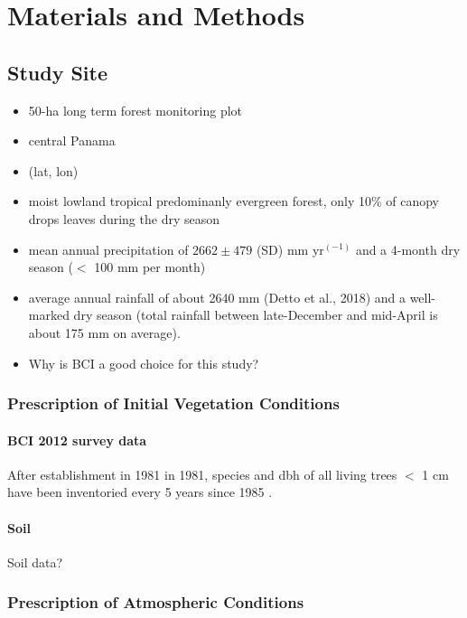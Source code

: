 \documentclass[10pt]{article}
\begin{document}
\section*{Materials and Methods}

\subsection*{Study Site}

\begin{itemize}
    \item 50-ha long term forest monitoring plot
    \item  central Panama
    \item (lat, lon)
    \item moist lowland tropical predominanly evergreen forest, only 10\% of canopy drops leaves during the dry season %
    \item mean annual precipitation of $2662 \pm 479$ (SD) mm yr$^{(-1)}$ and a 4-month dry season ($<$ 100 mm per month)  
    \item average annual rainfall of about 2640 mm (Detto et al.,
2018) and a well-marked dry season (total rainfall between late-December and mid-April is about 175 mm on average). 
    \item Why is BCI a good choice for this study?
\end{itemize}

\subsubsection*{Prescription of Initial Vegetation Conditions}

\paragraph{BCI 2012 survey data}
After establishment in 1981 in 1981, species and dbh of all living trees $<$ 1 cm have been inventoried every 5 years since 1985 \cite{condit_1995}. 

\paragraph{Soil} 
Soil data?

\subsubsection*{Prescription of Atmospheric Conditions}
\end{document}
